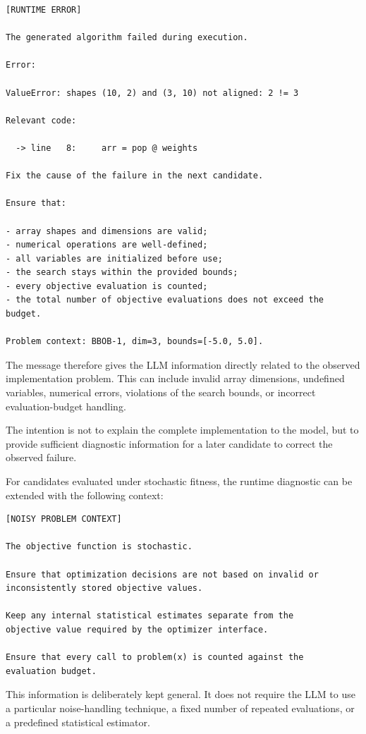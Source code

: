 \begin{verbatim}
[RUNTIME ERROR]

The generated algorithm failed during execution.

Error:

ValueError: shapes (10, 2) and (3, 10) not aligned: 2 != 3

Relevant code:

  -> line   8:     arr = pop @ weights

Fix the cause of the failure in the next candidate.

Ensure that:

- array shapes and dimensions are valid;
- numerical operations are well-defined;
- all variables are initialized before use;
- the search stays within the provided bounds;
- every objective evaluation is counted;
- the total number of objective evaluations does not exceed the budget.

Problem context: BBOB-1, dim=3, bounds=[-5.0, 5.0].
\end{verbatim}

The message therefore gives the LLM information directly related to the
observed implementation problem. This can include invalid array dimensions,
undefined variables, numerical errors, violations of the search bounds, or
incorrect evaluation-budget handling.

The intention is not to explain the complete implementation to the model, but
to provide sufficient diagnostic information for a later candidate to correct
the observed failure.

For candidates evaluated under stochastic fitness, the runtime diagnostic can
be extended with the following context:

\begin{verbatim}
[NOISY PROBLEM CONTEXT]

The objective function is stochastic.

Ensure that optimization decisions are not based on invalid or
inconsistently stored objective values.

Keep any internal statistical estimates separate from the
objective value required by the optimizer interface.

Ensure that every call to problem(x) is counted against the
evaluation budget.
\end{verbatim}

This information is deliberately kept general. It does not require the LLM to
use a particular noise-handling technique, a fixed number of repeated
evaluations, or a predefined statistical estimator.

